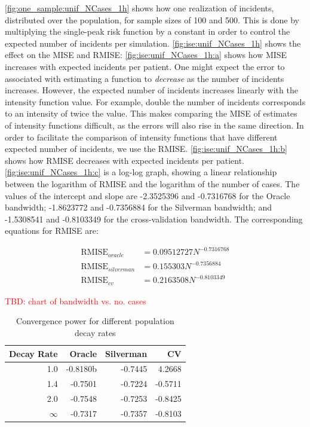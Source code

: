 \autoref{fig:one_sample:unif_NCases_1h} shows how one realization of incidents, distributed over the population, for sample sizes of 100 and 500.
This is done by multiplying the single-peak risk function by a constant in order to control the expected number of incidents per simulation.
\autoref{fig:ise:unif_NCases_1h} shows the effect on the MISE and RMISE:
\autoref{fig:ise:unif_NCases_1h:a} shows how MISE increases with expected incidents per patient.
One might expect the error to associated with estimating a function to \textit{decrease} as the number of incidents increases.
However, the expected number of incidents increases linearly with the intensity function value.
For example, double the number of incidents corresponds to an intensity of twice the value.
This makes comparing the MISE of estimates of intensity functions difficult, as the errors will also rise in the same direction.
In order to facilitate the comparison of intensity functions that have different expected number of incidents, we use the RMISE.
\autoref{fig:ise:unif_NCases_1h:b} shows how RMISE decreases with expected incidents per patient.
\autoref{fig:ise:unif_NCases_1h:c} is a log-log graph, showing a linear relationship between the logarithm of RMISE and the logarithm of the number of cases.
The values of the intercept and slope are -2.3525396 and -0.7316768 for the Oracle bandwidth; -1.8623772 and -0.7356884 for the Silverman bandwidth; and -1.5308541 and -0.8103349 for the cross-validation bandwidth.
The corresponding equations for RMISE are:

\begin{align}
    \mbox{RMISE}_{oracle} &= 0.09512727 N^{-0.7316768} \\
    \mbox{RMISE}_{silverman} &= 0.155303 N^{-0.7356884} \\
    \mbox{RMISE}_{cv} &= 0.2163508 N^{-0.8103349}
\end{align}

\textcolor{red}{TBD: chart of bandwidth vs. no. cases}

\begin{table}
\centering
\begin{tabular}{rrrr}
    \hline
    Decay Rate & Oracle & Silverman & CV \\ 
    \hline
    1.0 & -0.8180b & -0.7445 & 4.2668 \\
    1.4 & -0.7501 & -0.7224 & -0.5711 \\
    2.0 & -0.7548 & -0.7253 & -0.8425 \\
    \( \infty \) & -0.7317 & -0.7357 & -0.8103
\end{tabular}
\caption{Convergence power for different population decay rates}
\label{tbl:convergence_vs_decay}
\end{table}

